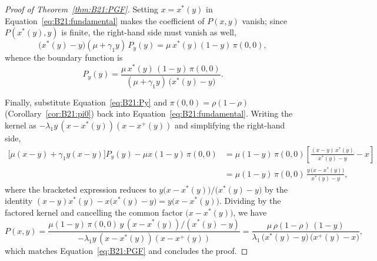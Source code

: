 \begin{proof}[Proof of Theorem~\ref{thm:B21:PGF}]
Setting $x=x^*(y)$ in Equation~\eqref{eq:B21:fundamental} makes the coefficient of $P(x,y)$ vanish; since $P(x^*(y),y)$ is finite, the right-hand side must vanish as well,
\begin{equation*}
    \bigl(x^*(y)-y\bigr)(\mu+\gamma_1 y)\,P_y(y) = \mu\, x^*(y)(1-y)\,\pi(0,0),
\end{equation*}
whence the boundary function is
\begin{equation}
    P_y(y) = \frac{\mu\,x^*(y)\,(1-y)\,\pi(0,0)}
                  {(\mu+\gamma_1 y)\,\bigl(x^*(y)-y\bigr)}.
    \label{eq:B21:Py}
\end{equation}

Finally, substitute Equation~\eqref{eq:B21:Py} and $\pi(0,0)=\rho(1-\rho)$ (Corollary~\ref{cor:B21:pi0}) back into Equation~\eqref{eq:B21:fundamental}. Writing the kernel as $-\lambda_1 y\,(x-x^*(y))(x-x^+(y))$ and simplifying the right-hand side,
\begin{align*}
    \bigl[\mu(x-y)+\gamma_1 y(x-y)\bigr]P_y(y) - \mu x(1-y)\,\pi(0,0)
    &= \mu(1-y)\,\pi(0,0)\left[\frac{(x-y)\,x^*(y)}{x^*(y)-y}-x\right] \\
    &= \mu(1-y)\,\pi(0,0)\,\frac{y\,\bigl(x-x^*(y)\bigr)}{x^*(y)-y},
\end{align*}
where the bracketed expression reduces to $y\bigl(x-x^*(y)\bigr)/\bigl(x^*(y)-y\bigr)$ by the identity $(x-y)x^*(y)-x\bigl(x^*(y)-y\bigr)=y\bigl(x-x^*(y)\bigr)$. Dividing by the factored kernel and cancelling the common factor $\bigl(x-x^*(y)\bigr)$, we have
\begin{equation*}
    P(x,y) = \frac{\mu(1-y)\,\pi(0,0)\,y\,(x-x^*(y))/(x^*(y)-y)}
                  {-\lambda_1 y\,(x-x^*(y))(x-x^+(y))}
           = \frac{\mu\,\rho(1-\rho)\,(1-y)}
                  {\lambda_1\,\bigl(x^*(y)-y\bigr)\,\bigl(x^+(y)-x\bigr)},
\end{equation*}
which matches Equation~\eqref{eq:B21:PGF} and concludes the proof.
\end{proof}
